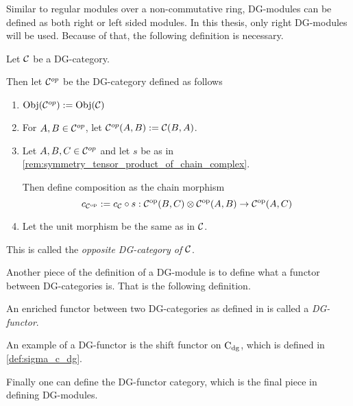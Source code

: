 Similar to regular modules over a non-commutative ring, DG-modules can be defined as both right or left sided modules. In this thesis, only right DG-modules will be used. Because of that, the following definition is necessary.

\begin{definition}
    \label{def:opposite_dg_category}
    Let \( {\mathcal{C}} \) be a DG-category.

    Then let \( {\mathcal{C}}^{op} \) be the DG-category defined as follows
    \begin{enumerate}
        \item {
            \( \operatorname{Obj}({\mathcal{C}}^{op}) := \operatorname{Obj}({\mathcal{C}}) \)
        }
        \item {
            For \( A, B \in {\mathcal{C}}^{op} \), let \( {\mathcal{C}}^{op}(A, B) := {\mathcal{C}}(B, A) \).
        }
        \item {
            Let \( A, B, C \in {\mathcal{C}}^{op} \) and let \( s \) be as in \autoref{rem:symmetry_tensor_product_of_chain_complex}.
            
            Then define composition as the chain morphism
            \[
                c_{{\mathcal{C}}^{\operatorname{op}}} :=  c_{{\mathcal{C}}} \circ s: {\mathcal{C}}^{\operatorname{op}} (B, C) \otimes {\mathcal{C}}^{\operatorname{op}} (A, B) \to {\mathcal{C}}^{\operatorname{op}} (A, C)
            \]
        }
        \item {
            Let the unit morphism be the same as in \( {\mathcal{C}} \).
        }
    \end{enumerate}
    This is called the \emph{opposite DG-category of \( {\mathcal{C}} \)}.
\end{definition}

Another piece of the definition of a DG-module is to define what a functor between DG-categories is. That is the following definition.

\begin{definition}[DG-functor]
    An enriched functor between two DG-categories as defined in \cite[Definition 6.2.3]{Borceux_1994} is called a \emph{DG-functor}.
\end{definition}

An example of a DG-functor is the shift functor on \( \operatorname{C}_{\operatorname{dg}} \), which is defined in \autoref{def:sigma_c_dg}.

Finally one can define the DG-functor category, which is the final piece in defining DG-modules.

